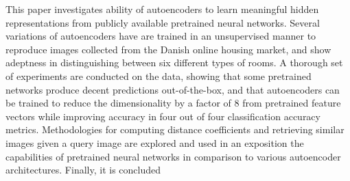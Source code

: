 This paper investigates ability of autoencoders to learn meaningful hidden representations from publicly available pretrained neural networks.
Several variations of autoencoders have are trained in an unsupervised manner to reproduce images collected from the Danish online housing market, and show adeptness in distinguishing between six different types of rooms.
\newline
\newline
A thorough set of experiments are conducted on the data, showing that some pretrained networks produce decent predictions out-of-the-box, and that autoencoders can be trained to reduce the dimensionality by a factor of 8 from pretrained feature vectors while improving accuracy in four out of four classification accuracy metrics.
\newline
Methodologies for computing distance coefficients and retrieving similar images given a query image are explored and used in an exposition the capabilities of pretrained neural networks in comparison to various autoencoder architectures.
\newline
\newline
Finally, it is concluded 


